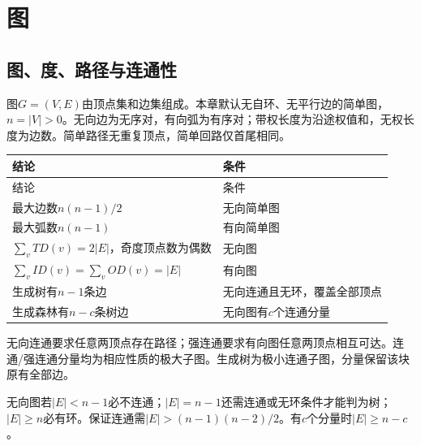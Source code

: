 \chapter{图}\label{DS06}

\section{图、度、路径与连通性}\label{DS06-definition}

图\(G=(V,E)\)由顶点集和边集组成。本章默认无自环、无平行边的简单图，\(n=|V|>0\)。无向边为无序对，有向弧为有序对；带权长度为沿途权值和，无权长度为边数。简单路径无重复顶点，简单回路仅首尾相同。

\par\smallskip
{\fontsize{9.3}{12}\selectfont\setlength{\tabcolsep}{2.5pt}\setlength{\LTleft}{0pt}\setlength{\LTright}{0pt}
\begin{longtable}{@{}>{\raggedright\arraybackslash}p{}>{\raggedright\arraybackslash}p{}@{}}
\toprule
结论 & 条件 \\

\midrule\endfirsthead\toprule
结论 & 条件 \\

\midrule\endhead\bottomrule\endfoot
最大边数\(n(n-1)/2\) & 无向简单图 \\

最大弧数\(n(n-1)\) & 有向简单图 \\

\(\sum_v TD(v)=2|E|\)，奇度顶点数为偶数 & 无向图 \\

\(\sum_v ID(v)=\sum_v OD(v)=|E|\) & 有向图 \\

生成树有\(n-1\)条边 & 无向连通且无环，覆盖全部顶点 \\

生成森林有\(n-c\)条树边 & 无向图有\(c\)个连通分量 \\

\end{longtable}}
\par\smallskip

无向连通要求任意两顶点存在路径；强连通要求有向图任意两顶点相互可达。连通/强连通分量均为相应性质的极大子图。生成树为极小连通子图，分量保留该块原有全部边。

无向图若\(|E|<n-1\)必不连通；\(|E|=n-1\)还需连通或无环条件才能判为树；\(|E|\ge n\)必有环。保证连通需\(|E|>(n-1)(n-2)/2\)。有\(c\)个分量时\(|E|\ge n-c\)。

